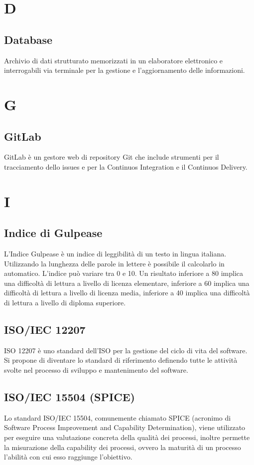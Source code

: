 	\section{D}
	\subsection{Database}
	
	Archivio di dati strutturato  memorizzati in un elaboratore elettronico e interrogabili via terminale per la gestione e l'aggiornamento delle informazioni.
	\section{G}

	\subsection{GitLab} 
	GitLab è un gestore web di repository Git che include strumenti per il tracciamento dello issues e per la Continuos Integration e il Continuos Delivery.
	
	
	\section{I}

	\subsection{Indice di Gulpease}
	
	L'Indice Gulpease è un indice di leggibilità di un testo in lingua italiana. Utilizzando la lunghezza delle parole in lettere è possibile il calcolarlo in automatico.
	L'indice può variare tra 0 e 10. Un risultato inferiore a 80 implica una difficoltà di lettura a livello di licenza elementare, inferiore a 60 implica una difficoltà di lettura a livello di licenza media, inferiore a 40 implica una difficoltà di lettura a livello di diploma superiore.
	\subsection{ISO/IEC 12207}
		ISO 12207 è uno standard dell'ISO per la gestione del ciclo di vita del software. Si propone di diventare lo standard di riferimento definendo tutte le attività svolte nel processo di sviluppo e mantenimento del software.
	\subsection{ISO/IEC 15504 (SPICE)}
	Lo standard ISO/IEC 15504, comunemente chiamato SPICE (acronimo di Software Process Improvement and Capability Determination), viene utilizzato per eseguire una valutazione concreta della qualità dei processi, inoltre permette la misurazione della capability dei processi, ovvero la maturità
	di un processo l’abilità con cui esso raggiunge l’obiettivo.

